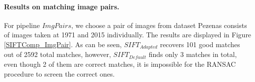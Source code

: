 \paragraph{Results on matching image pairs.}
For pipeline ${ImgPairs}$, we choose a pair of images from dataset Pezenas consists of images taken at 1971 and 2015 individually. The results are displayed in Figure \ref{SIFTComp_ImgPair}. As can be seen, $SIFT_{Adapted}$ recovers 101 good matches out of 2592 total matches, however, $SIFT_{Default}$ finds only 3 matches in total, even though 2 of them are correct matches, it is impossible for the RANSAC procedure to screen the correct ones.\\

